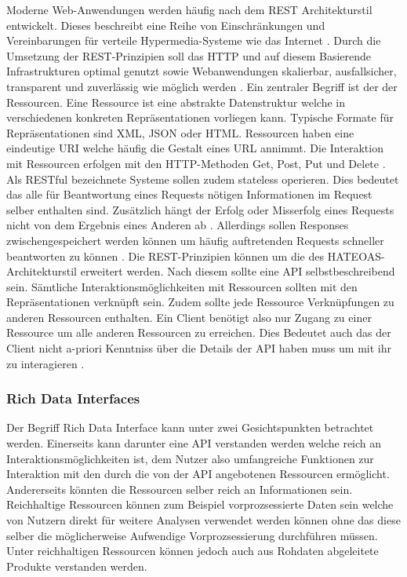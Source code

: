 Moderne Web-Anwendungen werden häufig nach dem REST Architekturstil entwickelt. Dieses beschreibt eine Reihe von Einschränkungen und Vereinbarungen für 
verteile Hypermedia-Systeme wie das Internet \cite{api_design}. 
Durch die Umsetzung der REST-Prinzipien soll das HTTP und auf diesem Basierende Infrastrukturen optimal genutzt sowie Webanwendungen skalierbar, ausfallsicher, transparent 
und zuverlässig wie möglich werden \cite{api_design} \cite{testbed_11}. 
Ein zentraler Begriff ist der der Ressourcen. Eine Ressource ist eine abstrakte Datenstruktur welche in verschiedenen konkreten Repräsentationen vorliegen kann. 
Typische Formate für Repräsentationen sind XML, JSON oder HTML. 
Ressourcen haben eine eindeutige URI welche häufig die Gestalt eines URL annimmt. 
Die Interaktion mit Ressourcen erfolgen mit den HTTP-Methoden Get, Post, Put und Delete \cite{api_design}.  
Als RESTful bezeichnete Systeme sollen zudem stateless operieren. Dies bedeutet das alle für Beantwortung eines Requests nötigen Informationen im Request selber enthalten sind. 
Zusätzlich hängt der Erfolg oder Misserfolg eines Requests nicht von dem Ergebnis eines Anderen ab \cite{api_design, testbed_11}. 
Allerdings sollen Responses zwischengespeichert werden können um häufig auftretenden Requests schneller beantworten zu können \cite{testbed_11}.
Die REST-Prinzipien können um die des HATEOAS-Architekturstil erweitert werden. Nach diesem sollte eine API selbstbeschreibend sein. Sämtliche Interaktionsmöglichkeiten 
mit Ressourcen sollten mit den Repräsentationen verknüpft sein. Zudem sollte jede Ressource Verknüpfungen zu anderen Ressourcen enthalten. Ein Client benötigt also nur Zugang 
zu einer Ressource um alle anderen Ressourcen zu erreichen. Dies Bedeutet auch das der Client nicht a-priori Kenntniss über die Details der 
API haben muss um mit ihr zu interagieren \cite{api_design}. 

\subsubsection{Rich Data Interfaces}
Der Begriff Rich Data Interface kann unter zwei Gesichtspunkten betrachtet werden. Einerseits kann darunter eine API verstanden werden welche 
reich an Interaktionsmöglichkeiten ist, dem Nutzer also umfangreiche Funktionen zur Interaktion mit den durch die von der API angebotenen Ressourcen ermöglicht.
Andererseits könnten die Ressourcen selber reich an Informationen sein. Reichhaltige Ressourcen können zum Beispiel vorprozsessierte Daten 
sein welche von Nutzern direkt für weitere Analysen verwendet werden können ohne das diese selber die möglicherweise Aufwendige Vorprozsessierung durchführen müssen.\\ 
Unter reichhaltigen Ressourcen können jedoch auch aus Rohdaten abgeleitete Produkte verstanden werden. 

